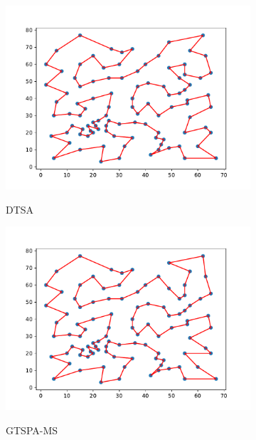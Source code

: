\documentclass[12pt]{article}
\theoremstyle{plain}
\theoremstyle{definition}
\theoremstyle{remark}
\begin{document}
\begin{figure}[ht]
	\centering
	\begin{subfigure}{.5\textwidth}
		\centering
		\includegraphics[scale = 0.44]{../../Implementation/gen/best_path_dtsa_eil101}
		\label{fig:best_path_dtsa_eil101}
		\caption{DTSA}
	\end{subfigure}%
	\begin{subfigure}{.5\textwidth}
		\centering
		\includegraphics[scale = 0.44]{../../Implementation/gen/best_path_gtspams_eil101}
		\label{fig:best_path_gtspams_eil101}
		\caption{GTSPA-MS}
	\end{subfigure}
	\begin{subfigure}{.5\textwidth}
		\centering

\end{subfigure}
\end{figure}
\end{document}
